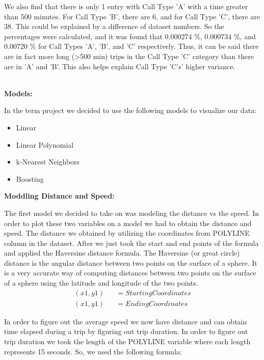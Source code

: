 \documentclass[11pt]{article}
\begin{document}
\par
We also find that there is only 1 entry with Call Type 'A' with a time greater than 500 minutes. For Call Type 'B', there are 6, and for Call Type 'C', there are 38. 
This could be explained by a difference of dataset numbers. So the percentages were calculated, and it was found that 0.000274 \%, 0.000734 \%, and 0.00720 \% for 
Call Types 'A', 'B', and 'C' respectively. Thus, it can be said there are in fact more long (>500 min) trips in the Call Type 'C' category than there are in 'A' and 
'B'. This also helps explain Call Type 'C's' higher variance.

\\
\textbf{Models:}
\par
In the term project we decided to use the following models to visualize our data:
\begin{itemize}
	\item Linear
	\item Linear Polynomial
	\item k-Nearest Neighbors
	\item Boosting
\end{itemize}

\textbf{Moddling Distance and Speed:}
\par
The first model we decided to take on was modeling the distance vs the 
speed. In order to plot these two variables on a model we had to obtain 
the distance and speed. The distance we obtained by utilizing the 
coordinates from POLYLINE column in the dataset. After we just took the 
start and end points of the formula and applied the Haversine distance 
formula. The Haversine (or great circle) distance is the angular distance 
between two points on the surface of a sphere. It is a very accurate way 
of computing distances between two points on the surface of a sphere using 
the latitude and longitude of the two points.
\begin{equation*}
	\begin{aligned}
		(x1,y1) &&= Starting Coordinates\\
		(x1,y1) &&=Ending Coordinates
	\end{aligned}
\end{equation*}

\par
In order to figure out the average speed we now have distance and can obtain time elapsed during a trip by figuring out trip duration. In order to figure out trip duration we took the length of the POLYLINE variable where each length represents 15 seconds. So, we used the following formula:
\end{document}
